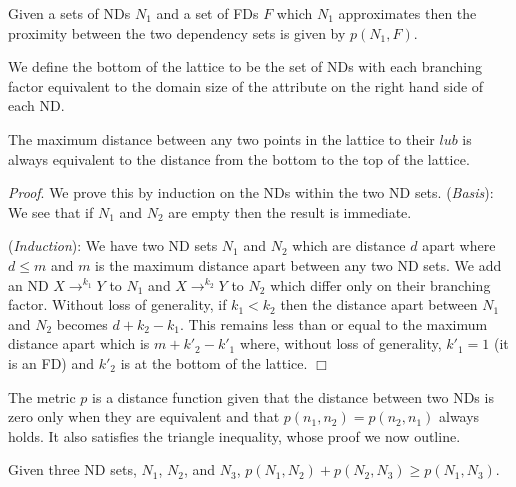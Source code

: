 \begin{definition}\label{def:pfd}
\begin{rm}
Given a sets of NDs $N_1$ and a set of FDs $F$ which $N_1$ approximates
then the proximity between the two dependency sets is given by $p(N_1,F)$.
\end{rm}
\end{definition}

We define the bottom of the
lattice to be the set of NDs with each branching factor equivalent to
the domain size of the attribute on the right hand side of each
ND.

\smallskip
\begin{proposition}
\begin{rm}
The maximum distance between any two points in
the lattice to their $lub$ is always equivalent to the
distance from the bottom to the top of the lattice. 
\end{rm}
\end{proposition}

{\em Proof}. We prove this by induction on the NDs within the two ND sets.\newline 
\smallskip
\indent ({\em Basis}): We see that if $N_1$ and $N_2$ are empty then the
result is immediate.

\smallskip

({\em Induction}): We have two ND sets $N_1$ and $N_2$ which are distance
$d$ apart where $d \le m$ and $m$ is the maximum distance apart between
any two ND sets. We add an ND $X \to^{k_1} Y$
to $N_1$ and $X \to^{k_2} Y$ to $N_2$ which differ only
on their branching factor. Without loss of generality, if $k_1 < k_2$ then the
distance apart between $N_1$ and $N_2$ becomes $d + k_2 - k_1$. This 
remains less than or equal to the maximum distance apart which is $m + k'_2 -
k'_1$ where, without loss of generality, $k'_1 = 1$ (it is an FD) and
$k'_2$ is at the bottom of the lattice. $\Box$

\smallskip

The metric $p$ is a distance function given that the distance
between two NDs is zero only when they are equivalent and that 
$p(n_1,n_2) = p(n_2,n_1)$ always holds. It also satisfies the 
triangle inequality, whose proof we now outline. 

\begin{theorem}
\begin{rm}
Given three ND sets, $N_1$, $N_2$, and $N_3$, $p(N_1,N_2) + p(N_2,N_3)
\ge p(N_1,N_3)$.
\end{rm}
\end{theorem}
\smallskip


